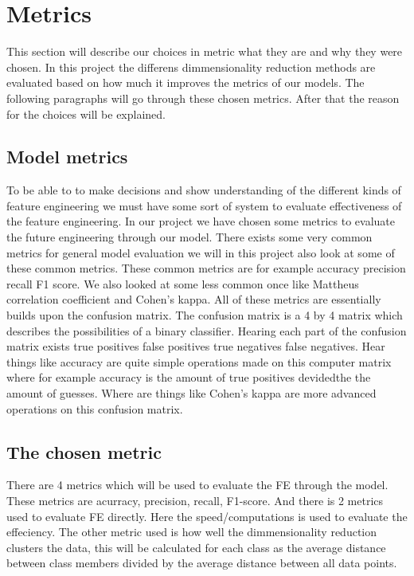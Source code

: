 \section{Metrics}
This section will describe our choices in metric what they are and why they were chosen. In this project the differens dimmensionality reduction methods are evaluated based on how much it improves the metrics of our models.
The following paragraphs will go through these chosen metrics. After that the reason for the choices will be explained.

\subsection*{Model metrics}
To be able to to make decisions and show understanding of the different kinds of feature engineering we must have some sort of system to evaluate effectiveness of the  feature engineering. In our project we have chosen some metrics to evaluate the future engineering through our model. There exists some very common metrics for general model evaluation we will in this project also look at some of these common metrics. These common metrics are for example accuracy precision recall F1 score. We also looked at some less common once like Mattheus correlation coefficient and Cohen's kappa. All of these metrics are essentially builds upon the confusion matrix. The confusion matrix is a 4 by 4 matrix which describes the possibilities of a binary classifier. Hearing each part of the confusion matrix exists true positives false positives true negatives false negatives. Hear things like accuracy are quite simple operations made on this computer matrix where for example accuracy is the amount of true positives devidedthe the amount of guesses. Where are things like Cohen's kappa are more advanced operations on this confusion matrix.
\cite{Metrics-for-multi}

\subsection{The chosen metric}
There are 4 metrics which will be used to evaluate the FE through the model. These metrics are acurracy, precision, recall, F1-score. And there is 2 metrics used to evaluate FE directly. Here the speed/computations is used to evaluate the effeciency. The other metric used is how well the dimmensionality reduction clusters the data, this will be calculated for each class as the average distance between class members divided by the average distance between all data points.

